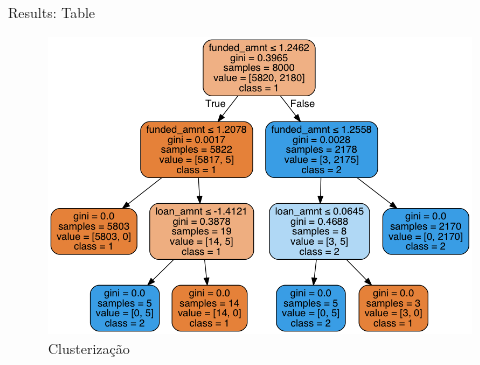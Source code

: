\documentclass[final,hyperref={pdfpagelabels=false}]{beamer}
\begin{document}
\begin{frame}[t]
\begin{columns}[t]
\begin{column}{.465\textwidth}
\begin{block}{Results: Table}
\begin{itemize}
\begin{figure}
\includegraphics[width=0.7\linewidth]{loan.png}
\caption{Clusterização}
\end{figure}

\end{itemize}



     
\end{block}


\end{column}
\end{columns}
\end{frame}
\end{document}
